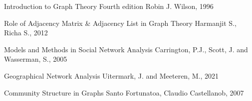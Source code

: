 \documentclass[12pt]{article}
\begin{document}
\begin{thebibliography}{100}
   	{Introduction to Graph Theory Fourth edition }
    Robin J. Wilson,
    1996
    
    {Role of Adjacency Matrix & Adjacency List in Graph Theory}
    Harmanjit S., Richa S.,
    2012
        
    {Models and Methods in Social Network Analysis}
    Carrington, P.J., Scott, J. and Wasserman, S.,
    2005
    
    {Geographical Network Analysis}
    Uitermark, J. and Meeteren, M.,
    2021
    
    {Community Structure in Graphs}
    Santo Fortunatoa, Claudio Castellanob,
    2007
\end{thebibliography}
\end{document}
